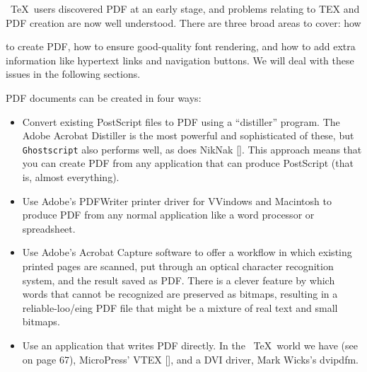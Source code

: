
\ \TeX\ users discovered PDF at an early stage, and problems relating to TEX and 
PDF creation are now well understood. There are three broad areas to cover: how 
 
to create PDF, how to ensure good-quality font rendering, and how to add
extra information like hypertext links and navigation buttons. We will
deal with these issues in the following sections. 


PDF documents can be created in four ways: 

\begin{itemize}
  \item  Convert existing PostScript files to PDF using a ``distiller''
    program. The Adobe Acrobat Distiller is the most powerful and
    sophisticated of these, but \verb|Ghostscript| also performs well, as
    does NikNak []. This approach means that you can create PDF from any
    application that can produce PostScript (that is, almost everything). 
  \item  Use Adobe's PDFWriter printer driver for VVindows and Macintosh to produce 
    PDF from any normal application like a word processor or spreadsheet. 
  \item  Use Adobe's Acrobat Capture software to offer a workflow in which existing 
    printed pages are scanned, put through an optical character recognition system, 
    and the result saved as PDF. There is a clever feature by which words that 
    cannot be recognized are preserved as bitmaps, resulting in a reliable-loo/eing 
    PDF file that might be a mixture of real text and small bitmaps. 
  \item  Use an application that writes PDF directly. In the \ \TeX\
    world we have \pdfTEX 
    (see  on page 67), MicroPress' VTEX  [], and a DVI 
    driver, Mark Wicks's dvipdfm. 

\end{itemize}

